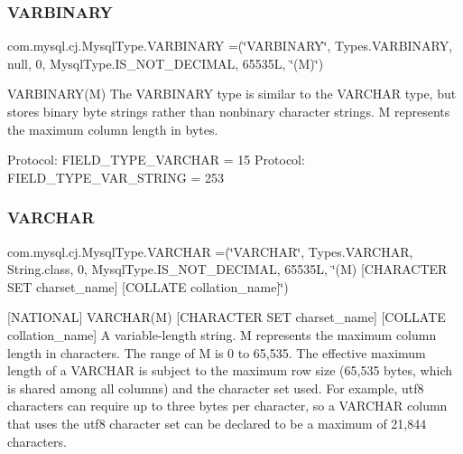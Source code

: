 \subsubsection{\texorpdfstring{V\+A\+R\+B\+I\+N\+A\+RY}{VARBINARY}}
{\footnotesize\ttfamily com.\+mysql.\+cj.\+Mysql\+Type.\+V\+A\+R\+B\+I\+N\+A\+RY =(\char`\"{}V\+A\+R\+B\+I\+N\+A\+RY\char`\"{}, Types.\+V\+A\+R\+B\+I\+N\+A\+RY, null, 0, Mysql\+Type.\+I\+S\+\_\+\+N\+O\+T\+\_\+\+D\+E\+C\+I\+M\+AL, 65535\+L, \char`\"{}(\+M)\char`\"{})}

V\+A\+R\+B\+I\+N\+A\+R\+Y(\+M) The V\+A\+R\+B\+I\+N\+A\+RY type is similar to the V\+A\+R\+C\+H\+AR type, but stores binary byte strings rather than nonbinary character strings. M represents the maximum column length in bytes.

Protocol\+: F\+I\+E\+L\+D\+\_\+\+T\+Y\+P\+E\+\_\+\+V\+A\+R\+C\+H\+AR = 15 Protocol\+: F\+I\+E\+L\+D\+\_\+\+T\+Y\+P\+E\+\_\+\+V\+A\+R\+\_\+\+S\+T\+R\+I\+NG = 253 \mbox{\label{enumcom_1_1mysql_1_1cj_1_1_mysql_type_a46a41a74f7598b207cfc15b8fdf3cd34}} 
\subsubsection{\texorpdfstring{V\+A\+R\+C\+H\+AR}{VARCHAR}}
{\footnotesize\ttfamily com.\+mysql.\+cj.\+Mysql\+Type.\+V\+A\+R\+C\+H\+AR =(\char`\"{}V\+A\+R\+C\+H\+AR\char`\"{}, Types.\+V\+A\+R\+C\+H\+AR, String.\+class, 0, Mysql\+Type.\+I\+S\+\_\+\+N\+O\+T\+\_\+\+D\+E\+C\+I\+M\+AL, 65535\+L, \char`\"{}(\+M) \mbox{[}\+C\+H\+A\+R\+A\+C\+T\+E\+R S\+E\+T charset\+\_\+name\mbox{]} \mbox{[}\+C\+O\+L\+L\+A\+T\+E collation\+\_\+name\mbox{]}\char`\"{})}

\mbox{[}N\+A\+T\+I\+O\+N\+AL\mbox{]} V\+A\+R\+C\+H\+A\+R(\+M) \mbox{[}C\+H\+A\+R\+A\+C\+T\+ER S\+ET charset\+\_\+name\mbox{]} \mbox{[}C\+O\+L\+L\+A\+TE collation\+\_\+name\mbox{]} A variable-\/length string. M represents the maximum column length in characters. The range of M is 0 to 65,535. The effective maximum length of a V\+A\+R\+C\+H\+AR is subject to the maximum row size (65,535 bytes, which is shared among all columns) and the character set used. For example, utf8 characters can require up to three bytes per character, so a V\+A\+R\+C\+H\+AR column that uses the utf8 character set can be declared to be a maximum of 21,844 characters.


